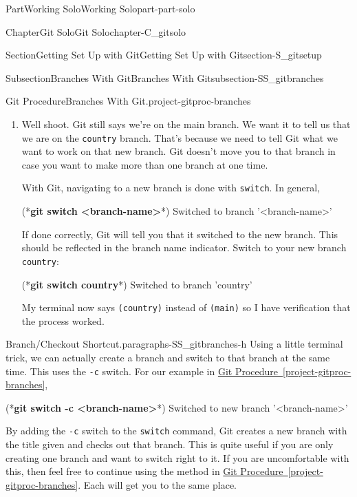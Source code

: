 \documentclass[oneside,10pt,]{book}
\newcommand{\xreffont}{\relax}
\newcommand{\mono}[1]{\texttt{#1}}
\newcommand{\consoleinput}[1]{\textbf{#1}}
\begin{document}
\begin{partptx}{Part}{Working Solo}{}{Working Solo}{}{}{part-part-solo}
\begin{chapterptx}{Chapter}{Git Solo}{}{Git Solo}{}{}{chapter-C_gitsolo}
\begin{sectionptx}{Section}{Getting Set Up with Git}{}{Getting Set Up with Git}{}{}{section-S_gitsetup}
\begin{subsectionptx}{Subsection}{Branches With Git}{}{Branches With Git}{}{}{subsection-SS_gitbranches}
\begin{project}{Git Procedure}{Branches With Git.}{project-gitproc-branches}
\begin{enumerate}[font=\bfseries,label=(\alph*),ref=\alph*]
\begin{console}{0}{1}{0}
(*\consoleinput{git branch <branch-name>}*)
\end{console}
where \mono{<branch-name>} is the non-spaced name of your new branch. Try creating a new branch now, with the name of \mono{country}. So,%
\begin{console}{0}{1}{0}
(*\consoleinput{git branch country}*)
\end{console}
\item{}Well shoot. Git still says we're on the main branch. We want it to tell us that we are on the \mono{country} branch. That's because we need to tell Git what we want to work on that new branch. Git doesn't move you to that branch in case you want to make more than one branch at one time.%
\par
With Git, navigating to a new branch is done with \mono{switch}. In general,%
\begin{console}{0}{1}{0}
(*\consoleinput{git switch <branch-name>}*)
Switched to branch '<branch-name>'
\end{console}
If done correctly, Git will tell you that it switched to the new branch. This should be reflected in the branch name indicator. Switch to your new branch \mono{country}:%
\begin{console}{0}{1}{0}
(*\consoleinput{git switch country}*)
Switched to branch 'country'
\end{console}
My terminal now says \mono{(country)} instead of \mono{(main)} so I have verification that the process worked.%
\end{enumerate}%
\end{project}%
\begin{paragraphs}{Branch\slash{}Checkout Shortcut.}{paragraphs-SS_gitbranches-h}%
Using a little terminal trick, we can actually create a branch and switch to that branch at the same time. This uses the \mono{-c} switch. For our example in \hyperref[project-gitproc-branches]{Git Procedure~{\xreffont\ref{project-gitproc-branches}}},%
\begin{console}{0}{1}{0}
(*\consoleinput{git switch -c <branch-name>}*)
Switched to new branch '<branch-name>'
\end{console}
By adding the \mono{-c} switch to the \mono{switch} command, Git creates a new branch with the title given and checks out that branch. This is quite useful if you are only creating one branch and want to switch right to it. If you are uncomfortable with this, then feel free to continue using the method in \hyperref[project-gitproc-branches]{Git Procedure~{\xreffont\ref{project-gitproc-branches}}}. Each will get you to the same place.%

\end{paragraphs}
\end{subsectionptx}
\end{sectionptx}
\end{chapterptx}
\end{partptx}
\end{document}
